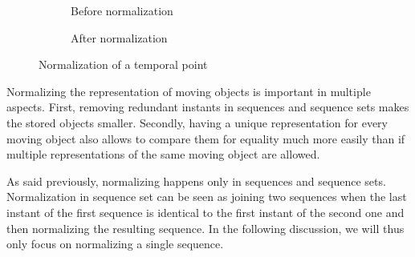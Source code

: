 \begin{figure}[h!]
\centering
\vspace{.5 cm}
\begin{subfigure}[b]{0.475\textwidth}
    \centering
    \caption{Before normalization}
\end{subfigure}
\hfill
\begin{subfigure}[b]{0.475\textwidth}
    \centering
    \caption{After normalization}
\end{subfigure}
\caption{Normalization of a temporal point}
\label{fig:tgeopointseq_normalization}
\end{figure}

Normalizing the representation of moving objects is important in multiple aspects. First, removing redundant instants in sequences and sequence sets makes the stored objects smaller. Secondly, having a unique representation for every moving object also allows to compare them for equality much more easily than if multiple representations of the same moving object are allowed.

As said previously, normalizing happens only in sequences and sequence sets. Normalization in sequence set can be seen as joining two sequences when the last instant of the first sequence is identical to the first instant of the second one and then normalizing the resulting sequence. In the following discussion, we will thus only focus on normalizing a single sequence.


